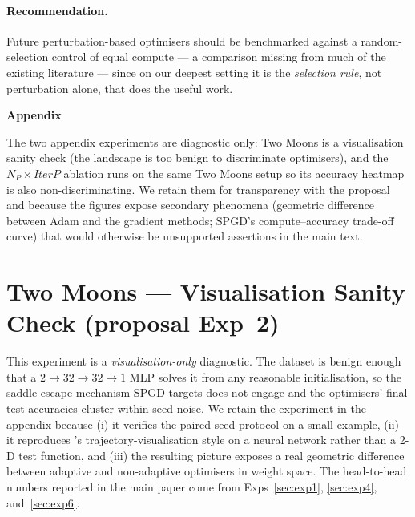 \documentclass[11pt]{article}
\newcommand{\np}{\ensuremath{N_P}}
\newcommand{\iterp}{\ensuremath{\textit{IterP}}}
\begin{document}
\paragraph{Recommendation.}  Future perturbation-based optimisers
should be benchmarked against a random-selection control of equal
compute --- a comparison missing from much of the existing literature
--- since on our deepest setting it is the \emph{selection rule},
not perturbation alone, that does the useful work.

\clearpage
\appendix
\renewcommand{\thesection}{\Alph{section}}

\begin{center}
{\Large\bfseries Appendix}
\end{center}

\noindent The two appendix experiments are diagnostic only: Two Moons
is a visualisation sanity check (the landscape is too benign to
discriminate optimisers), and the $\np \times \iterp$ ablation runs
on the same Two Moons setup so its accuracy heatmap is also
non-discriminating.  We retain them for transparency with the
proposal and because the figures expose secondary phenomena
(geometric difference between Adam and the gradient methods;
SPGD's compute--accuracy trade-off curve) that would otherwise be
unsupported assertions in the main text.

\vspace{0.6em}

\section{Two Moons --- Visualisation Sanity Check (proposal Exp~2)}
\label{app:two-moons}
\label{sec:exp2}

This experiment is a \emph{visualisation-only} diagnostic.  The
dataset is benign enough that a $2 \to 32 \to 32 \to 1$ MLP solves it
from any reasonable initialisation, so the saddle-escape mechanism
SPGD targets does not engage and the optimisers' final test
accuracies cluster within seed noise.  We retain the experiment in the
appendix because (i) it verifies the paired-seed protocol on a small
example, (ii) it reproduces \citet{vahedi2024spgd}'s
trajectory-visualisation style on a neural network rather than a 2-D
test function, and (iii) the resulting picture exposes a real
geometric difference between adaptive and non-adaptive optimisers in
weight space.  The head-to-head numbers reported in the main paper
come from Exps~\ref{sec:exp1}, \ref{sec:exp4}, and~\ref{sec:exp6}.
\end{document}
